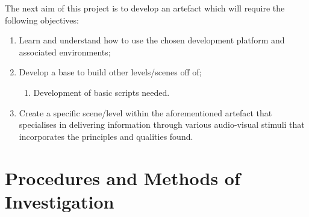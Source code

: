 \noindent The next aim of this project is to develop an artefact which will require the following objectives:
\begin{enumerate}
\item Learn and understand how to use the chosen development platform and associated environments;
\item Develop a base to build other levels/scenes off of;
\begin{enumerate}
\item Development of basic scripts needed.
\end{enumerate}
\item Create a specific scene/level within the aforementioned artefact that specialises in delivering information through various audio-visual stimuli that incorporates the principles and qualities found.
\end{enumerate}

\section{Procedures and Methods of Investigation}
